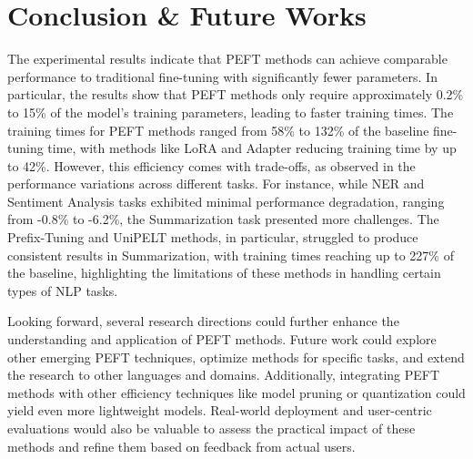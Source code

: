 \section{Conclusion \& Future Works}

The experimental results indicate that PEFT methods can achieve comparable performance to traditional fine-tuning with significantly fewer parameters. In particular, the results show that PEFT methods only require approximately 0.2\% to 15\% of the model’s training parameters, leading to faster training times. The training times for PEFT methods ranged from 58\% to 132\% of the baseline fine-tuning time, with methods like LoRA and Adapter reducing training time by up to 42\%. However, this efficiency comes with trade-offs, as observed in the performance variations across different tasks. For instance, while NER and Sentiment Analysis tasks exhibited minimal performance degradation, ranging from -0.8\% to -6.2\%, the Summarization task presented more challenges. The Prefix-Tuning and UniPELT methods, in particular, struggled to produce consistent results in Summarization, with training times reaching up to 227\% of the baseline, highlighting the limitations of these methods in handling certain types of NLP tasks.

Looking forward, several research directions could further enhance the understanding and application of PEFT methods. Future work could explore other emerging PEFT techniques, optimize methods for specific tasks, and extend the research to other languages and domains. Additionally, integrating PEFT methods with other efficiency techniques like model pruning or quantization could yield even more lightweight models. Real-world deployment and user-centric evaluations would also be valuable to assess the practical impact of these methods and refine them based on feedback from actual users.

